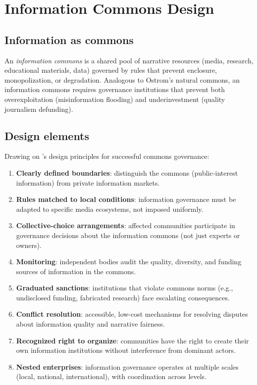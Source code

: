 \section{Information Commons Design}
\label{sec:ch33-information-commons}

\subsection{Information as commons}

\begin{definition}
\label{def:information-commons}
An \emph{information commons} is a shared pool of narrative resources (media, research, educational materials, data) governed by rules that prevent enclosure, monopolization, or degradation.
Analogous to Ostrom's natural commons, an information commons requires governance institutions that prevent both overexploitation (misinformation flooding) and underinvestment (quality journalism defunding).
\end{definition}

\subsection{Design elements}

Drawing on \textcite{ostrom1990}'s design principles for successful commons governance:

\begin{model}
\label{mod:info-commons}
\begin{enumerate}[nosep]
  \item \textbf{Clearly defined boundaries}: distinguish the commons (public-interest information) from private information markets.
  \item \textbf{Rules matched to local conditions}: information governance must be adapted to specific media ecosystems, not imposed uniformly.
  \item \textbf{Collective-choice arrangements}: affected communities participate in governance decisions about the information commons (not just experts or owners).
  \item \textbf{Monitoring}: independent bodies audit the quality, diversity, and funding sources of information in the commons.
  \item \textbf{Graduated sanctions}: institutions that violate commons norms (e.g., undisclosed funding, fabricated research) face escalating consequences.
  \item \textbf{Conflict resolution}: accessible, low-cost mechanisms for resolving disputes about information quality and narrative fairness.
  \item \textbf{Recognized right to organize}: communities have the right to create their own information institutions without interference from dominant actors.
  \item \textbf{Nested enterprises}: information governance operates at multiple scales (local, national, international), with coordination across levels.
\end{enumerate}
\end{model}

